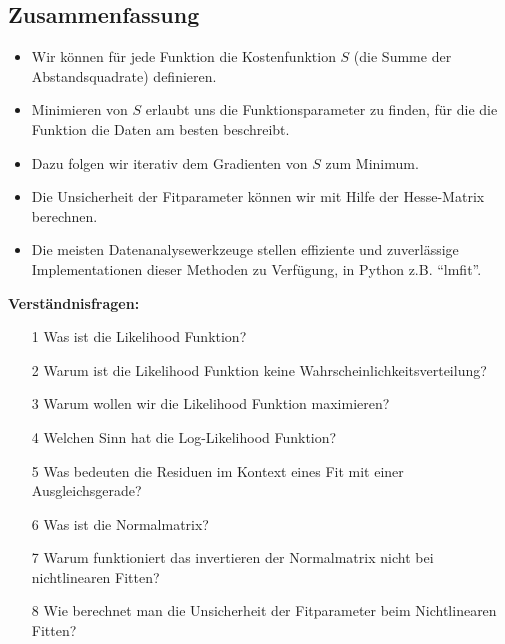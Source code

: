 \subsection{Zusammenfassung}
\label{subsec:vl9-4}

\begin{itemize}
    \setlength\itemsep{0em}
        \item Wir können für jede Funktion die Kostenfunktion $S$ (die Summe der Abstandsquadrate) definieren.
        \item Minimieren von $S$ erlaubt uns die Funktionsparameter zu finden, für die die Funktion die Daten am besten beschreibt.
        \item Dazu folgen wir iterativ dem Gradienten von $S$ zum Minimum.
        \item Die Unsicherheit der Fitparameter können wir mit Hilfe der Hesse-Matrix berechnen.
        \item Die meisten Datenanalysewerkzeuge stellen effiziente und zuverlässige Implementationen dieser Methoden zu Verfügung, in Python z.B. ``lmfit''.
\end{itemize}


\newpage

\begin{tcolorbox}[enhanced,width=6in,
    fontupper=\small,drop fuzzy shadow southwest,
    colframe=black!50!black,colback=black!5]
\textbf{Verständnisfragen:} \\
\begin{enumerate}
\item[1] Was ist die Likelihood Funktion?
\item[2] Warum ist die Likelihood Funktion keine Wahrscheinlichkeitsverteilung? 
\item[3] Warum wollen wir die Likelihood Funktion maximieren? 
\item[4] Welchen Sinn hat die Log-Likelihood Funktion? 
\item[5] Was bedeuten die Residuen im Kontext eines Fit mit einer Ausgleichsgerade? 
\item[6] Was ist die Normalmatrix? 
\item[7] Warum funktioniert das invertieren der Normalmatrix nicht bei nichtlinearen Fitten? 
\item[8] Wie berechnet man die Unsicherheit der Fitparameter beim Nichtlinearen Fitten? 
\end{enumerate}
\end{tcolorbox}

